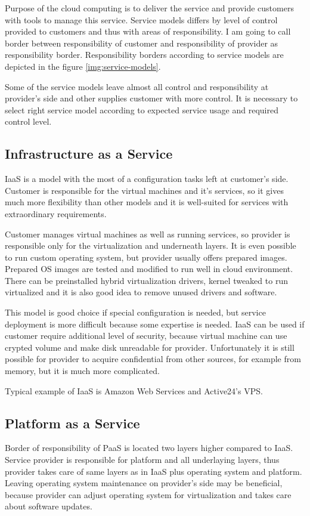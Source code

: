 
Purpose of the cloud computing is to deliver the service and provide customers with tools to manage this service. Service models differs by level of control provided to customers and thus with areas of responsibility. I am going to call border between responsibility of customer and responsibility of provider as responsibility border. Responsibility borders according to service models are depicted in the figure \ref{img:service-models}.

Some of the service models leave almost all control and responsibility at provider's side and other supplies customer with more control. It is necessary to select right service model according to expected service usage and required control level.

\subsection{Infrastructure as a Service}
\Ac{IaaS} is a model with the most of a configuration tasks left at customer's side. Customer is responsible for the virtual machines and it's services, so it gives much more flexibility than other models and it is well-suited for services with extraordinary requirements. 

Customer manages virtual machines as well as running services, so provider is responsible only for the virtualization and underneath layers. It is even possible to run custom operating system, but provider usually offers prepared images. Prepared \Ac{OS} images are tested and modified to run well in cloud environment. There can be preinstalled hybrid virtualization drivers, kernel tweaked to run virtualized and it is also good idea to remove unused drivers and software. 

This model is good choice if special configuration is needed, but service deployment is more difficult because some expertise is needed. \Ac{IaaS} can be used if customer require additional level of security, because virtual machine can use crypted volume and make disk unreadable for provider. Unfortunately it is still possible for provider to acquire confidential from other sources, for example from memory, but it is much more complicated.

Typical example of \Ac{IaaS} is Amazon Web Services and Active24's VPS.

\subsection{Platform as a Service}
Border of responsibility of \Ac{PaaS} is located two layers higher compared to \Ac{IaaS}. Service provider is responsible for platform and all underlaying layers, thus provider takes care of same layers as in \Ac{IaaS} plus operating system and platform. 
Leaving operating system maintenance on provider's side may be beneficial, because provider can adjust operating system for virtualization and takes care about software updates. 

